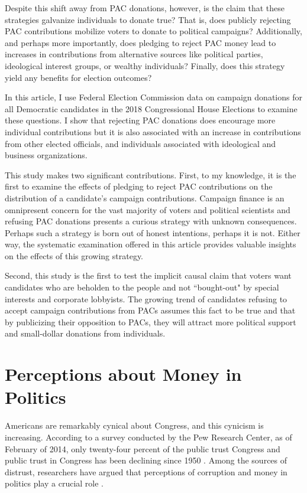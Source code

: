 \documentclass[12pt]{article}
\begin{document}
Despite this shift away from PAC donations, however, is the claim that these strategies galvanize individuals to donate true? That is, does publicly rejecting PAC contributions mobilize voters to donate to political campaigns? Additionally, and perhaps more importantly, does pledging to reject PAC money lead to increases in contributions from alternative sources like political parties, ideological interest groups, or wealthy individuals? Finally, does this strategy yield any benefits for election outcomes?

In this article, I use Federal Election Commission data on campaign donations for all Democratic candidates in the 2018 Congressional House Elections to examine these questions. I show that rejecting PAC donations does encourage more individual contributions but it is also associated with an increase in contributions from other elected officials, and individuals associated with ideological and business organizations.   

This study makes two significant contributions. First, to my knowledge, it is the first to examine the effects of pledging to reject PAC contributions on the distribution of a  candidate's campaign contributions. Campaign finance is an omnipresent concern for the vast majority of voters and political scientists and refusing PAC donations presents a curious strategy with unknown consequences. Perhaps such a strategy is born out of honest intentions, perhaps it is not. Either way, the systematic examination offered in this article provides valuable insights on the effects of this growing strategy. 

Second, this study is the first to test the implicit causal claim that voters want candidates who are beholden to the people and not ``bought-out" by special interests and corporate lobbyists. The growing trend of candidates refusing to accept campaign contributions from PACs assumes this fact to be true and that by publicizing their opposition to PACs, they will attract more political support and small-dollar donations from individuals.  


\section{Perceptions about Money in Politics}

 Americans are remarkably cynical about Congress, and this cynicism is increasing. According to a survey conducted by the Pew Research Center, as of February of 2014, only twenty-four percent of the public trust Congress \citep{pew_research_center_public_2014} and public trust in Congress has been declining since 1950 \citep{dalton_social_2005}. Among the sources of distrust, researchers have argued that perceptions of corruption and money in politics play a crucial role \citep{persily_perceptions_2004, vanheerde-hudson_parties_2013}. 
 
\end{document}
